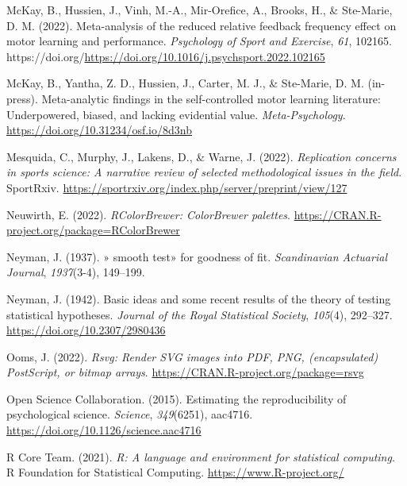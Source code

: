 \documentclass[
  man, donotrepeattitle,mask,floatsintext]{apa7}
\newlength{\cslhangindent}
\newlength{\cslentryspacingunit} %
\newenvironment{CSLReferences}[2] %
 {%
  \setlength{\parindent}{0pt}
  \ifodd #1
  \let\oldpar\par
  \def\par{\hangindent=\cslhangindent\oldpar}
  \fi
  \setlength{\parskip}{#2\cslentryspacingunit}
 }%
 {}
\begin{document}
\begin{CSLReferences}{1}{0}
\leavevmode{}%
McKay, B., Hussien, J., Vinh, M.-A., Mir-Orefice, A., Brooks, H., \& Ste-Marie, D. M. (2022). Meta-analysis of the reduced relative feedback frequency effect on motor learning and performance. \emph{Psychology of Sport and Exercise}, \emph{61}, 102165. https://doi.org/\url{https://doi.org/10.1016/j.psychsport.2022.102165}

\leavevmode{}%
McKay, B., Yantha, Z. D., Hussien, J., Carter, M. J., \& Ste-Marie, D. M. (in-press). Meta-analytic findings in the self-controlled motor learning literature: {Underpowered}, biased, and lacking evidential value. \emph{Meta-Psychology}. \url{https://doi.org/10.31234/osf.io/8d3nb}

\leavevmode{}%
Mesquida, C., Murphy, J., Lakens, D., \& Warne, J. (2022). \emph{Replication concerns in sports science: A narrative review of selected methodological issues in the field}. SportRxiv. \url{https://sportrxiv.org/index.php/server/preprint/view/127}

\leavevmode{}%
Neuwirth, E. (2022). \emph{RColorBrewer: ColorBrewer palettes}. \url{https://CRAN.R-project.org/package=RColorBrewer}

\leavevmode{}%
Neyman, J. (1937). » smooth test» for goodness of fit. \emph{Scandinavian Actuarial Journal}, \emph{1937}(3-4), 149--199.

\leavevmode{}%
Neyman, J. (1942). Basic ideas and some recent results of the theory of testing statistical hypotheses. \emph{Journal of the Royal Statistical Society}, \emph{105}(4), 292--327. \url{https://doi.org/10.2307/2980436}

\leavevmode{}%
Ooms, J. (2022). \emph{Rsvg: Render SVG images into PDF, PNG, (encapsulated) PostScript, or bitmap arrays}. \url{https://CRAN.R-project.org/package=rsvg}

\leavevmode{}%
Open Science Collaboration. (2015). Estimating the reproducibility of psychological science. \emph{Science}, \emph{349}(6251), aac4716. \url{https://doi.org/10.1126/science.aac4716}

\leavevmode{}%
R Core Team. (2021). \emph{R: A language and environment for statistical computing}. R Foundation for Statistical Computing. \url{https://www.R-project.org/}


\end{CSLReferences}
\end{document}
